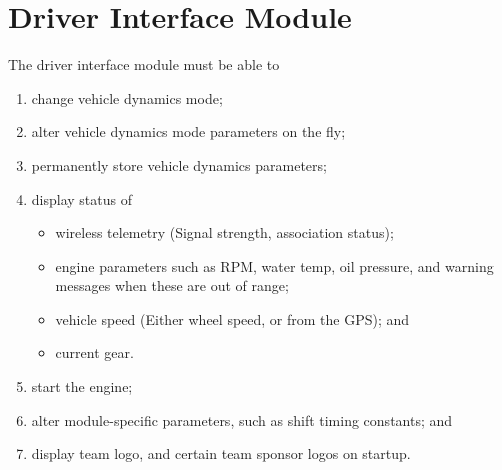 \section{Driver Interface Module}
The driver interface module must be able to
\begin{enumerate}
 \item change vehicle dynamics mode;
 \item alter vehicle dynamics mode parameters on the fly;
 \item permanently store vehicle dynamics parameters;
 \item display status of
  \begin{itemize}
    \item wireless telemetry (Signal strength, association status);
    \item engine parameters such as RPM, water temp, oil pressure, and warning messages when these are out of range;
    \item vehicle speed (Either wheel speed, or from the GPS); and
    \item current gear.
  \end{itemize}
 \item start the engine;
 \item alter module-specific parameters, such as shift timing constants; and
 \item display team logo, and certain team sponsor logos on startup.
\end{enumerate}